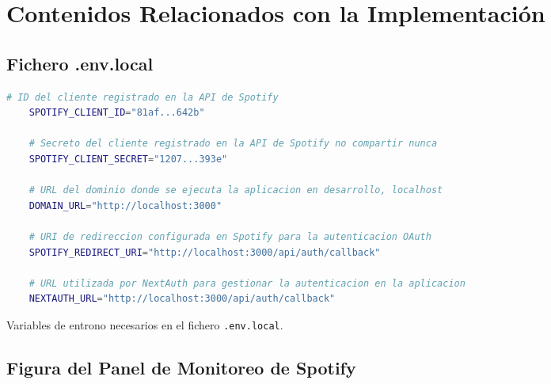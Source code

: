 
\chapter{Contenidos Relacionados con la Implementación} \label{ch:anexoC}

\section*{Fichero .env.local}

\begin{ifalgorithm}[H]
  \begin{lstlisting}[language=bash]
    # ID del cliente registrado en la API de Spotify
    SPOTIFY_CLIENT_ID="81af...642b"

    # Secreto del cliente registrado en la API de Spotify no compartir nunca
    SPOTIFY_CLIENT_SECRET="1207...393e"

    # URL del dominio donde se ejecuta la aplicacion en desarrollo, localhost
    DOMAIN_URL="http://localhost:3000"

    # URI de redireccion configurada en Spotify para la autenticacion OAuth
    SPOTIFY_REDIRECT_URI="http://localhost:3000/api/auth/callback"

    # URL utilizada por NextAuth para gestionar la autenticacion en la aplicacion
    NEXTAUTH_URL="http://localhost:3000/api/auth/callback"
    \end{lstlisting}
  \caption{Variables de entrono necesarios en el fichero \texttt{.env.local}.}
  \label{alg:variables_entorno}
\end{ifalgorithm}

\section*{Figura del Panel de Monitoreo de Spotify}

